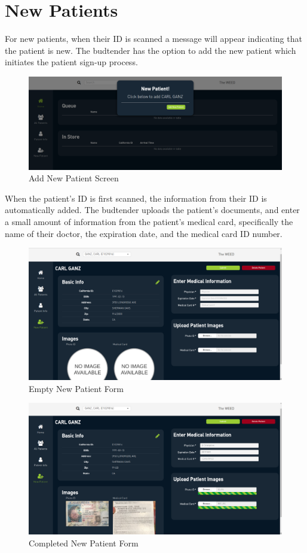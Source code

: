 \documentclass[]{book}
\theoremstyle{definition}
\theoremstyle{definition}
\theoremstyle{definition}
\theoremstyle{remark}
\begin{document}
\section{New Patients}\label{new-patients}

For new patients, when their ID is scanned a message will appear
indicating that the patient is new. The budtender has the option to add
the new patient which initiates the patient sign-up process.

\begin{figure}
\centering
\includegraphics{images/FD10.png}
\caption{Add New Patient Screen}
\end{figure}

When the patient's ID is first scanned, the information from their ID is
automatically added. The budtender uploads the patient's documents, and
enter a small amount of information from the patient's medical card,
specifically the name of their doctor, the expiration date, and the
medical card ID number.

\begin{figure}
\centering
\includegraphics{images/FD11.png}
\caption{Empty New Patient Form}
\end{figure}

\begin{figure}
\centering
\includegraphics{images/FD9.png}
\caption{Completed New Patient Form}
\end{figure}
\end{document}
